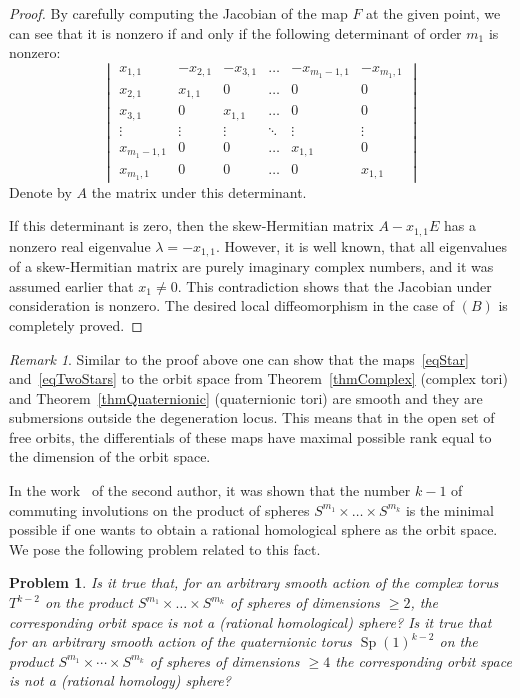 \documentclass[english, 12pt]{amsproc}
\newcounter{stmcounter}[section]
\newcounter{problcounter}
\numberwithin{equation}{section}
\theoremstyle{plain}
\newtheorem{probl}[problcounter]{Problem}
\theoremstyle{definition}
\theoremstyle{remark}
\newtheorem{rem}[stmcounter]{Remark}
\DeclareMathOperator{\Sp}{Sp}
\begin{document}
\begin{proof}
By carefully computing the Jacobian of the map $F$ at the given point, we can see that it is nonzero if and only if the following determinant of order $m_1$ is nonzero:
\[
\begin{vmatrix}
x_{1,1}& -x_{2,1}  & -x_{3,1} & \ldots & -x_{m_1-1,1} & -x_{m_1,1}\\
x_{2,1}& x_{1,1} & 0 & \ldots & 0 & 0\\
x_{3,1}& 0 & x_{1,1} &  \ldots & 0 & 0 \\
\vdots& \vdots & \vdots &\ddots  & \vdots  & \vdots\\
x_{m_1-1,1} & 0  & 0 & \ldots & x_{1,1}  & 0\\
x_{m_1,1}& 0 & 0 &\ldots & 0 &  x_{1,1}
\end{vmatrix}
\]
Denote by $A$ the matrix under this determinant.

If this determinant is zero, then the skew-Hermitian matrix $A-x_{1,1}E$ has a nonzero real eigenvalue $\lambda = -x_{1,1}$. However, it is well known, that all eigenvalues of a skew-Hermitian matrix are purely imaginary complex numbers, and it was assumed earlier that $x_1\neq 0$. This contradiction shows that the Jacobian under consideration is nonzero. The desired local diffeomorphism in the case of $(B)$ is completely proved.
\end{proof}

\begin{rem}\label{remSubmersion}
Similar to the proof above one can show that the maps~\eqref{eqStar} and~\eqref{eqTwoStars} to the orbit space from Theorem~\ref{thmComplex} (complex tori) and Theorem~\ref{thmQuaternionic} (quaternionic tori) are smooth and they are submersions outside the degeneration locus. This means that in the open set of free orbits, the differentials of these maps have maximal possible rank equal to the dimension of the orbit space.
\end{rem}

In the work~\cite{Gug23b} of the second author, it was shown that the number $k-1$ of commuting involutions on the product of spheres $S^{m_1}\times \ldots \times S^{m_k}$ is the minimal possible if one wants to obtain a rational homological sphere as the orbit space. We pose the following problem related to this fact.

\begin{probl}
Is it true that, for an arbitrary smooth action of the complex torus $T^{k-2}$ on the product $S^{m_1}\times \ldots \times S^{m_k}$ of spheres of dimensions $\geqslant2$, the corresponding orbit space is not a (rational homological) sphere? Is it true that for an arbitrary smooth action of the quaternionic torus $\Sp(1)^{k-2}$ on the product $S^{m_1}\times \cdots \times S^{m_k}$ of spheres of dimensions $\geqslant 4$ the corresponding orbit space is not a (rational homology) sphere?
\end{probl}
\end{document}
